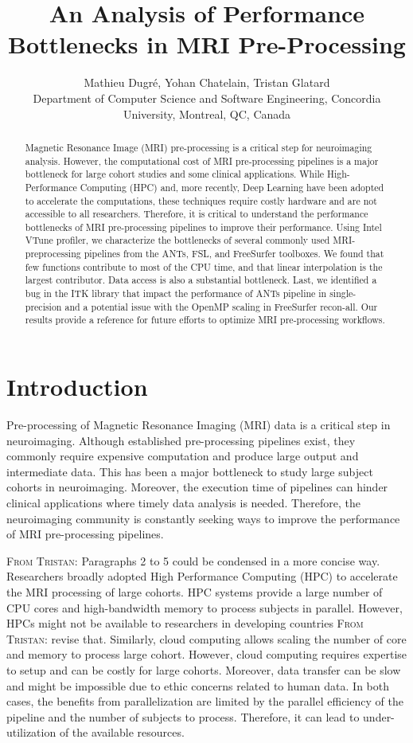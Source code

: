 \documentclass[conference]{IEEEtran}
\title{An Analysis of Performance Bottlenecks in MRI Pre-Processing}
\author{Mathieu Dugr\'e, Yohan Chatelain, Tristan Glatard\\Department of Computer Science and Software Engineering, Concordia University, Montreal, QC, Canada}
\newcommand{\TG}[1]{\color{blue}\textsc{From Tristan: }#1\color{black}}
\begin{document}
\maketitle

\begin{abstract}
	Magnetic Resonance Image (MRI) pre-processing is a critical step for neuroimaging analysis. However, the computational cost of MRI pre-processing pipelines is a major bottleneck for large cohort studies and some clinical applications. While High-Performance Computing (HPC) and, more recently, Deep Learning have been adopted to accelerate the computations, these techniques require costly hardware and are not accessible to all researchers. Therefore, it is critical to understand the performance bottlenecks of MRI pre-processing pipelines to improve their performance. Using Intel VTune profiler, we characterize the bottlenecks of several commonly used MRI-preprocessing pipelines from the ANTs, FSL, and FreeSurfer toolboxes. We found that few functions contribute to most of the CPU time, and that linear interpolation is the largest contributor. Data access is also  a substantial bottleneck. Last, we identified a bug in the ITK library that impact the performance of ANTs pipeline in single-precision and a potential issue with the OpenMP scaling in FreeSurfer recon-all. Our results provide a reference for future efforts to optimize MRI pre-processing workflows.
\end{abstract}

\section{Introduction}
Pre-processing of Magnetic Resonance Imaging (MRI) data is a critical step in neuroimaging. Although established pre-processing pipelines exist, they commonly require expensive computation and produce large output and intermediate data. This has been a major bottleneck to study large subject cohorts in neuroimaging. Moreover, the execution time of pipelines can hinder clinical applications where timely data analysis is needed. Therefore, the neuroimaging community is constantly seeking ways to improve the performance of MRI pre-processing pipelines.

\TG{Paragraphs 2 to 5 could be condensed in a more concise way.}
Researchers broadly adopted High Performance Computing (HPC) to accelerate the MRI processing of large cohorts. HPC systems provide a large number of CPU cores and high-bandwidth memory to process subjects in parallel. However, HPCs might not be available to researchers in developing countries \TG{revise that}. Similarly, cloud computing allows scaling the number of core and memory to process large cohort. However, cloud computing requires expertise to setup and can be costly for large cohorts. Moreover, data transfer can be slow and might be impossible due to ethic concerns related to human data. In both cases, the benefits from parallelization are limited by the parallel efficiency of the pipeline and the number of subjects to process. Therefore, it can lead to under-utilization of the available resources.
\end{document}
